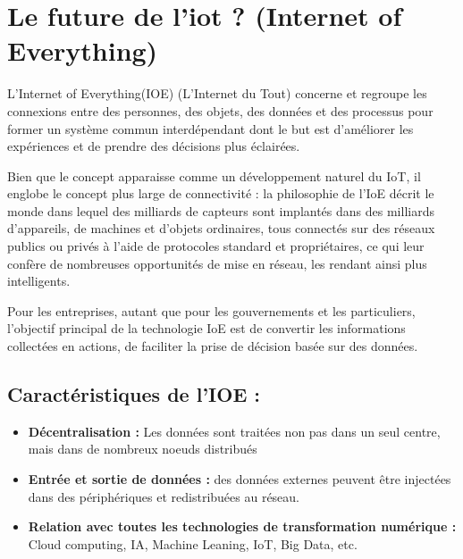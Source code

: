 \section{Le future de l'iot ? (Internet of Everything)}
L’Internet of Everything(IOE) (L’Internet du Tout) concerne et regroupe les connexions entre des personnes, des objets, des données et des processus pour former un système commun interdépendant dont le but est d’améliorer les expériences et de prendre des décisions plus éclairées.

Bien que le concept apparaisse comme un développement naturel du IoT, il englobe le concept plus large de connectivité : la philosophie de l’IoE décrit le monde dans lequel des milliards de capteurs sont implantés dans des milliards d’appareils, de machines et d’objets ordinaires, tous connectés sur des réseaux publics ou privés à l’aide de protocoles standard et propriétaires, ce qui leur confère de nombreuses opportunités de mise en réseau, les rendant ainsi plus intelligents.

Pour les entreprises, autant que pour les gouvernements et les particuliers, l’objectif principal de la technologie IoE est de convertir les informations collectées en actions, de faciliter la prise de décision basée sur des données.

\subsection{Caractéristiques de l'IOE :}
\begin{itemize}[label=\textbullet]
\item \textbf{Décentralisation :} Les données sont traitées non pas dans un seul centre, mais dans de nombreux noeuds distribués
\item \textbf{Entrée et sortie de données :} des données externes peuvent être injectées dans des périphériques et redistribuées au réseau.
\item \textbf{Relation avec toutes les technologies de transformation numérique :} Cloud computing, IA, Machine Leaning, IoT, Big Data, etc.
\end{itemize}

